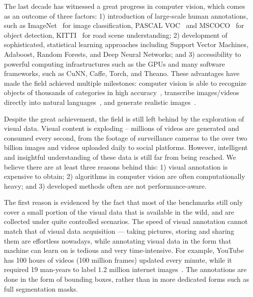 The last decade has witnessed a great progress in computer vision, which comes as an outcome of three factors: 1) introduction of large-scale human annotations, such as ImageNet~\citep{imagenet} for image classification, PASCAL VOC~\citep{pascal:2011} and MSCOCO~\citep{coco:eccv} for object detection, KITTI~\citep{kitti} for road scene understanding; 2) development of sophisticated, statistical learning approaches including Support Vector Machines, Adaboost, Random Forests, and Deep Neural Networks; and 3) accessibility to powerful computing infrastructures such as the GPUs and many software frameworks, such as CuNN, Caffe, Torch, and Theano. These advantages have made the field achieved multiple milestones: computer vision is able to recognize objects of thousands of categories in high accuracy~\citep{nips12:cnn, vgg16}, transcribe images/videos directly into natural languages~\citep{show:tell:caption}, and generate realistic images~\citep{draw:2015}. 

Despite the great achievement, the field is still left behind by the exploration of visual data.  Visual content is exploding -- millions of videos are generated and consumed every second, from the footage of surveillance cameras to the over two billion images and videos uploaded daily to social platforms. However, intelligent and insightful understanding of these data is still far from being reached. 
We believe there are at least three reasons behind this: 1) visual annotation is expensive to obtain; 2)  algorithms in computer vision are often computationally heavy; and 3) developed methods often are not performance-aware.   


The first reason is evidenced by the fact that most of the benchmarks still only cover a small portion of the visual data that is available in the wild, and are collected under quite controlled scenarios. The speed of visual annotation cannot match that of visual data acquisition --- taking pictures, storing and sharing them are effortless nowadays, while annotating visual data in the form that machine can learn on is tedious and very time-intensive. 
For example, 
YouTube has 100 hours of videos (100 million frames) updated every minute, while it required 19 man-years to label 1.2 million internet images~\citep{imagenet}. The annotations are done in the form of bounding boxes, rather than in more dedicated forms such as full segmentation masks. 

